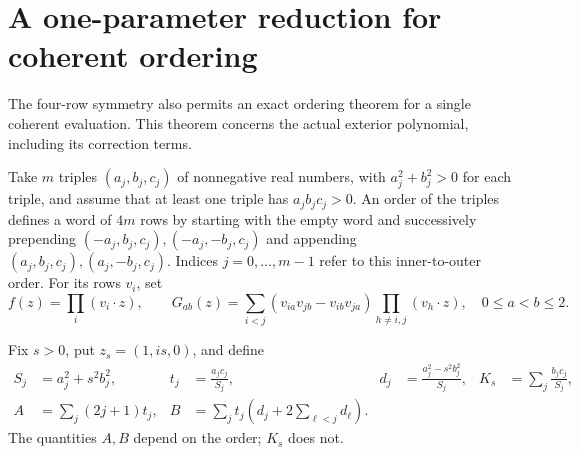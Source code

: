 
\section{A one-parameter reduction for coherent ordering}
\label{co:section}

The four-row symmetry also permits an exact ordering theorem for a
single coherent evaluation. This theorem concerns the actual exterior
polynomial, including its correction terms.

Take \(m\) triples \((a_j,b_j,c_j)\) of nonnegative real numbers,
with \(a_j^2+b_j^2>0\) for each triple, and assume that at least one
triple has \(a_jb_jc_j>0\). An order of the triples defines a word
of \(4m\) rows by starting with the empty word and successively
prepending \((-a_j,b_j,c_j),(-a_j,-b_j,c_j)\) and appending
\((a_j,b_j,c_j),(a_j,-b_j,c_j)\). Indices \(j=0,\ldots,m-1\)
refer to this inner-to-outer order. For its rows \(v_i\), set
\[
 f(z)=\prod_i(v_i\cdot z),\qquad
 G_{ab}(z)=\sum_{i<j}(v_{ia}v_{jb}-v_{ib}v_{ja})
                         \prod_{h\ne i,j}(v_h\cdot z),
 \quad 0\le a<b\le2.
\]

Fix \(s>0\), put \(z_s=(1,is,0)\), and define
\begin{align*}
 S_j&=a_j^2+s^2b_j^2,&
 t_j&=\frac{a_jc_j}{S_j},&
 d_j&=\frac{a_j^2-s^2b_j^2}{S_j},&
 K_s&=\sum_j\frac{b_jc_j}{S_j},\\
 A&=\sum_j(2j+1)t_j,&
 B&=\sum_jt_j\left(d_j+2\sum_{\ell<j}d_\ell\right).
\end{align*}
The quantities \(A,B\) depend on the order; \(K_s\) does not.

